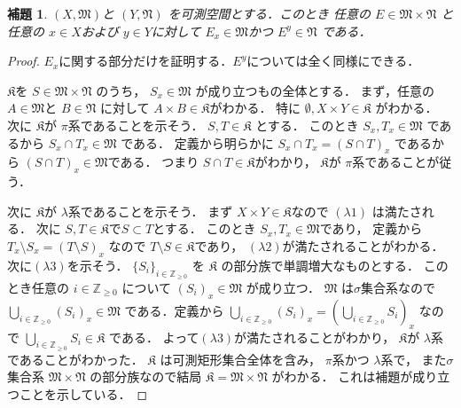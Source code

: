 \documentclass[leqno, a4paper, 12pt]{jsarticle}
\newtheorem{lem}[thm]{補題}
\newcommand{\zz}{\mathbb{Z}}
\begin{document}
\begin{lem}\label{lem:slice}
$(X, \mathfrak{M})$と
$(Y, \mathfrak{N})$
を可測空間とする．このとき
任意の
$E\in \mathfrak{M}\times \mathfrak{N}$
と任意の
$x\in X$および
$y\in Y$に対して
$E_{x}\in \mathfrak{M}$かつ
$E^{y}\in \mathfrak{N}$
である．
\end{lem}
\begin{proof}
$E_{x}$に関する部分だけを証明する．$E^{y}$については全く同様にできる．

$\mathfrak{K}$を
$S\in \mathfrak{M}\times \mathfrak{N}$
のうち，
$S_{x}\in \mathfrak{M}$
が成り立つもの全体とする．
まず，任意の
$A\in \mathfrak{M}$と
$B\in \mathfrak{N}$
に対して
$A\times B\in \mathfrak{K}$がわかる．
特に
$\emptyset, X\times Y\in \mathfrak{K}$
がわかる．
次に
$\mathfrak{K}$が
$\pi$系であることを示そう．
$S, T\in \mathfrak{K}$
とする．
このとき
$S_{x}, T_{x}\in \mathfrak{M}$
であるから
$S_{x}\cap T_{x}\in \mathfrak{M}$
である．
定義から明らかに
$S_{x}\cap T_{x}=(S\cap T)_{x}$
であるから
$(S\cap T)_{x}\in \mathfrak{M}$である．
つまり
$S\cap T\in \mathfrak{K}$がわかり，
$\mathfrak{K}$が
$\pi$系であることが従う．

次に
$\mathfrak{K}$が
$\lambda$系であることを示そう．
まず
$X\times Y\in \mathfrak{K}$なので
$(\lambda 1)$
は満たされる．
次に
$S, T\in \mathfrak{K}$で$S\subset T$とする．
このとき
$S_{x}, T_{x}\in \mathfrak{M}$であり，
定義から
$T_{x}\setminus S_{x}=(T\setminus S)_{x}$
なので
$T\setminus S\in \mathfrak{K}$であり，
$(\lambda 2)$が満たされることがわかる．
次に$(\lambda 3)$を示そう．
$\{S_{i}\}_{i\in \zz_{\ge 0}}$
を
$\mathfrak{K}$
の部分族で単調増大なものとする．
このとき任意の
$i\in \zz_{\ge 0}$
について
$(S_{i})_{x}\in \mathfrak{M}$
が成り立つ．
$\mathfrak{M}$
は$\sigma$集合系なので
$\bigcup_{i\in \zz_{\ge 0}}(S_{i})_{x}\in \mathfrak{M}$
である．定義から
$\bigcup_{i\in \zz_{\ge 0}}(S_{i})_{x}
=(\bigcup_{i\in \zz_{\ge 0}}S_{i})_{x}$
なので
$\bigcup_{i\in \zz_{\ge 0}}S_{i}\in \mathfrak{K}$
である．
よって$(\lambda 3)$が満たされることがわかり，
$\mathfrak{K}$が
$\lambda$系であることがわかった．
$\mathfrak{K}$
は可測矩形集合全体を含み，
$\pi$系かつ
$\lambda$系で，
また$\sigma$集合系
$\mathfrak{M}\times \mathfrak{N}$
の部分族なので結局
$\mathfrak{K}=\mathfrak{M}\times \mathfrak{N}$
がわかる．
これは補題が成り立つことを示している．
\end{proof}
\end{document}
